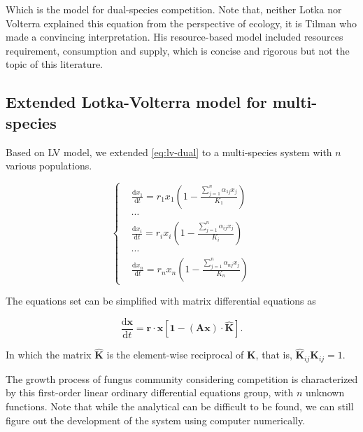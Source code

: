 Which is the model for dual-species competition. Note that, neither Lotka nor Volterra explained this equation from the perspective of ecology, it is Tilman who made a convincing interpretation. His resource-based model included resources requirement, consumption and supply, which is concise and rigorous but not the topic of this literature.


\subsection{Extended Lotka-Volterra model for multi-species}

Based on LV model, we extended \eqref{eq:lv-dual} to a multi-species system with $n$ various populations.

\begin{equation}\label{eq:lv-multi}
    \left\{\begin{aligned}     &
    \frac{\mathrm{d}x_1}{\mathrm{d}t} =
    r_1x_1\left(1 - \frac{\sum_{j=1}^n \alpha_{1j}x_j}{K_1}\right) \\ & \cdots \\ &
    \frac{\mathrm{d}x_i}{\mathrm{d}t} =
    r_ix_i\left(1 - \frac{\sum_{j=1}^n \alpha_{ij}x_j}{K_i}\right) \\ & \cdots \\ &
    \frac{\mathrm{d}x_n}{\mathrm{d}t} =
    r_nx_n\left(1 - \frac{\sum_{j=1}^n \alpha_{nj}x_j}{K_n}\right)
    \end{aligned}\right.
\end{equation}

The equations set can be simplified with matrix differential equations as

\begin{equation}\label{eq:lv-mat}
    \frac{\mathrm{d}\boldsymbol{x}}{\mathrm{d}t} =
    \boldsymbol{r}\cdot\boldsymbol{x}
    \left[\boldsymbol{1} - (\boldsymbol{Ax})\cdot\hat{\boldsymbol{K}}\right].
\end{equation}


In which the matrix $\hat{\boldsymbol{K}}$ is the element-wise reciprocal of $\boldsymbol{K}$, that is, $\hat{\boldsymbol{K}}_{ij}\boldsymbol{K}_{ij} = 1$. 

The growth process of fungus community considering competition is characterized by this first-order linear ordinary differential equations group, with $n$ unknown functions. Note that while the analytical can be difficult to be found, we can still figure out the development of the system using computer numerically.

